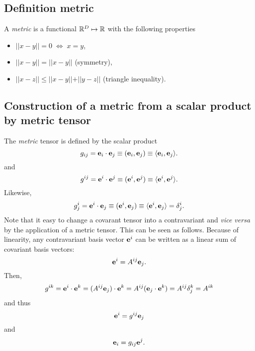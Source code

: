 \subsection{Definition metric}

A {\em metric} is a functional ${\Bbb R}^D\mapsto {\Bbb R}$
with the following properties
\begin{itemize}
\item
$\vert\vert x -y \vert\vert =0 \; \Longleftrightarrow \; x = y$,
\item
$\vert\vert x- y\vert\vert  =\vert\vert  x- y\vert\vert $  (symmetry),
\item
$\vert\vert x-z\vert\vert  \le \vert\vert x- y\vert\vert  + \vert\vert  y- z\vert\vert $  (triangle
inequality).
\end{itemize}



\subsection{Construction of a metric from a scalar product by metric tensor}

The {\em metric} tensor is defined by  the scalar product
\begin{equation}
g_{ij}={\bf e}_i\cdot {\bf e}_j\equiv ({\bf e}_i, {\bf e}_j)\equiv \langle {\bf e}_i, {\bf e}_j\rangle .
\end{equation}
and
\begin{equation}
g^{ij}={\bf e}^i\cdot {\bf e}^j\equiv ({\bf e}^i, {\bf e}^j)\equiv \langle {\bf e}^i, {\bf e}^j\rangle .
\end{equation}
Likewise,
\begin{equation}
g^i_{j}={\bf e}^i\cdot {\bf e}_j\equiv ({\bf e}^i, {\bf e}_j)\equiv \langle {\bf e}^i, {\bf e}_j\rangle =\delta^i_j .
\end{equation}
Note that it easy to change a covarant tensor into a contravariant and {\em vice versa}
by the application of a metric tensor.
This can be seen as follows.
Because of linearity, any contravariant basis vector ${\bf e}^i$
can be written as a linear sum of covariant basis vectors:
\begin{equation}
{\bf e}^i=A^{ij}{\bf e}_j.
\end{equation}
Then,
\begin{equation}
g^{ik} ={\bf e}^i\cdot {\bf e}^k =(A^{ij}{\bf e}_j)\cdot {\bf e}^k=A^{ij}({\bf e}_j\cdot {\bf e}^k)=A^{ij}\delta_j^k=A^{ik}
\end{equation}
and thus
\begin{equation}
{\bf e}^i=g^{ij}{\bf e}_j
\end{equation}
and
\begin{equation}
{\bf e}_i=g_{ij}{\bf e}^j.
\end{equation}


